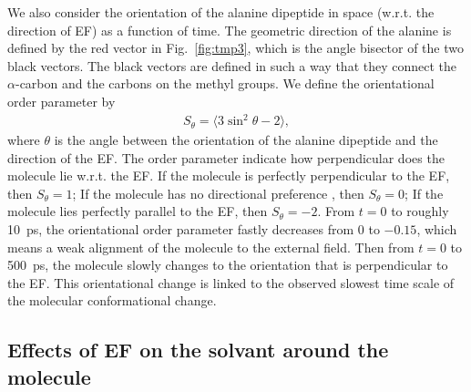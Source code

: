 \documentclass[a4paper,preprint,unsortedaddress,onecolumn]{revtex4-1}
\begin{document}
We also consider the orientation of the alanine dipeptide in space (w.r.t. the direction of EF) as a function
of time.
The geometric direction of the alanine is defined by the red vector in
Fig.~\ref{fig:tmp3}, which is the angle bisector of the two black vectors.
The black vectors are defined in such a way that they connect the $\alpha$-carbon and the carbons
on the methyl groups. We define the orientational order parameter by
\begin{align}
  S_\theta = \langle 3\sin^2\theta - 2\rangle,
\end{align}
where $\theta$ is the angle between the orientation of the alanine dipeptide
and the direction of the EF. The order parameter
indicate how perpendicular does the molecule lie w.r.t. the EF.
If the molecule is perfectly perpendicular to the EF, then $S_\theta = 1$;
If the molecule has no directional
preference , then $S_\theta = 0$;
If the molecule lies perfectly parallel to the EF, then $S_\theta = -2$.
From $t=0$ to roughly 10~ps, the orientational order parameter fastly
decreases from 0 to $-0.15$, which means a weak alignment of the molecule to the external field.
Then from $t=0$ to 500~ps, the molecule slowly changes to the orientation
that is perpendicular to the EF.
This orientational change is linked to the observed slowest
time scale of the molecular conformational change.


\subsection{Effects of EF on the solvant around the molecule}
\end{document}
